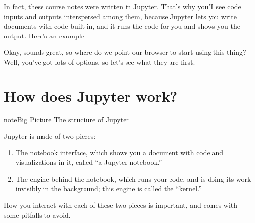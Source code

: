 \documentclass[letterpaper,10pt,english]{sphinxmanual}
\begin{document}
In fact, these course notes were written in Jupyter.  That’s why you’ll see code inputs and outputs interspersed among them, because Jupyter lets you write documents with code built in, and it runs the code for you and shows you the output.  Here’s an example:

\begin{sphinxVerbatim}[commandchars=\\\{\}]
   
 \PYG{p}{[}    \PYG{p}{]} 
\end{sphinxVerbatim}

\noindent{}

Okay, sounds great, so where do we point our browser to start using this thing?  Well, you’ve got lots of options, so let’s see what they are first.


\section{How does Jupyter work?}
\label{\detokenize{chapter-3-jupyter:how-does-jupyter-work}}
\begin{sphinxadmonition}{note}{Big Picture \sphinxhyphen{} The structure of Jupyter}

Jupyter is made of two pieces:
\begin{enumerate}
%
\item {} 
The notebook interface, which shows you a document with code and visualizations in it, called “a Jupyter notebook.”

\item {} 
The engine behind the notebook, which runs your code, and is doing its work invisibly in the background; this engine is called the “kernel.”

\end{enumerate}

How you interact with each of these two pieces is important, and comes with some pitfalls to avoid.
\end{sphinxadmonition}
\end{document}
